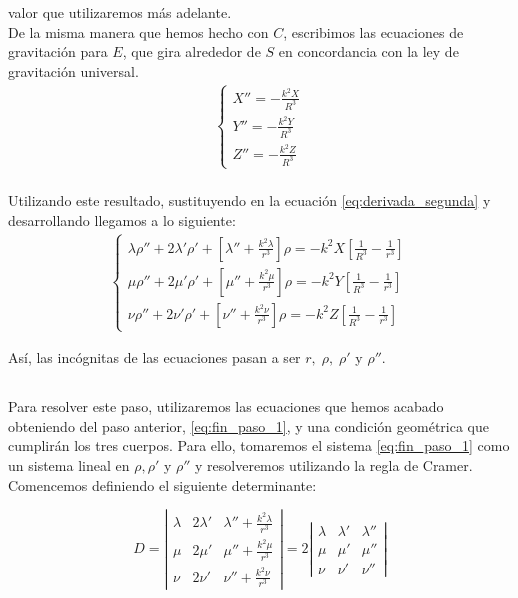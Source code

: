\documentclass[11pt]{article}
\begin{document}
\noindent valor que utilizaremos más adelante.\\

De la misma manera que hemos hecho con $C$, escribimos las ecuaciones de gravitación para $E$, que gira alrededor de $S$ en concordancia con la ley de gravitación universal.
\begin{align}
\left\{
\begin{array}{l}
	X'' = -\frac{k^2X}{R^3}\\
	Y'' = -\frac{k^2Y}{R^3}\\
	Z'' = -\frac{k^2Z}{R^3}
\end{array}
\right.
\label{eq:ley_gravitacion_E}
\end{align}\\

Utilizando este resultado, sustituyendo en la ecuación \ref{eq:derivada_segunda} y desarrollando llegamos a lo siguiente:
\begin{align}
\left\{
\begin{array}{l}
	\lambda\rho''+2\lambda'\rho'+[\lambda''+\frac{k^2\lambda}{r^3}]\rho=-k^2X[\frac{1}{R^3}-\frac{1}{r^3}]\\
	\mu\rho''+2\mu'\rho'+[\mu''+\frac{k^2\mu}{r^3}]\rho=-k^2Y[\frac{1}{R^3}-\frac{1}{r^3}]\\
	\nu\rho''+2\nu'\rho'+[\nu''+\frac{k^2\nu}{r^3}]\rho=-k^2Z[\frac{1}{R^3}-\frac{1}{r^3}]
\end{array}
\right.
\label{eq:fin_paso_1}
\end{align}

Así, las incógnitas de las ecuaciones pasan a ser $r, \; \rho, \; \rho'$ y $\rho''$.\\

\subsection{}
Para resolver este paso, utilizaremos las ecuaciones que hemos acabado obteniendo del paso anterior, \ref{eq:fin_paso_1}, y una condición geométrica que cumplirán los tres cuerpos. Para ello, tomaremos el sistema \ref{eq:fin_paso_1} como un sistema lineal en $\rho, \rho'$ y $\rho''$ y resolveremos utilizando la regla de Cramer. Comencemos definiendo el siguiente determinante:

\[
D =
\left|
\begin{array}{ccc}
	\lambda & 2\lambda' & \lambda''+\frac{k^2\lambda}{r^3}\\
	\mu & 2\mu' & \mu''+\frac{k^2\mu}{r^3}\\
	\nu & 2\nu' & \nu''+\frac{k^2\nu}{r^3}
\end{array}
\right|
=
2
\left|
\begin{array}{ccc}
	\lambda & \lambda' & \lambda''\\
	\mu & \mu' & \mu''\\
	\nu & \nu' & \nu''
\end{array}
\right|
\]
\end{document}
